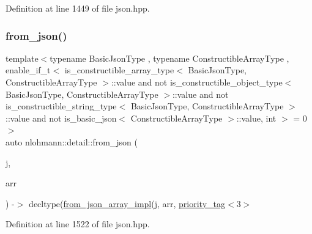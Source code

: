 Definition at line 1449 of file json.\+hpp.

\mbox{\label{namespacenlohmann_1_1detail_a14d8cdf544585f1c38eab6a0820e55f7}} 
\subsubsection{\texorpdfstring{from\_json()}{from\_json()}\hspace{0.1cm}{\footnotesize\ttfamily [12/18]}}
{\footnotesize\ttfamily template$<$typename Basic\+Json\+Type , typename Constructible\+Array\+Type , enable\+\_\+if\+\_\+t$<$ is\+\_\+constructible\+\_\+array\+\_\+type$<$ Basic\+Json\+Type, Constructible\+Array\+Type $>$\+::value and not is\+\_\+constructible\+\_\+object\+\_\+type$<$ Basic\+Json\+Type, Constructible\+Array\+Type $>$\+::value and not is\+\_\+constructible\+\_\+string\+\_\+type$<$ Basic\+Json\+Type, Constructible\+Array\+Type $>$\+::value and not is\+\_\+basic\+\_\+json$<$ Constructible\+Array\+Type $>$\+::value, int $>$  = 0$>$ \\
auto nlohmann\+::detail\+::from\+\_\+json (\begin{DoxyParamCaption}\item[{const Basic\+Json\+Type \&}]{j,  }\item[{Constructible\+Array\+Type \&}]{arr }\end{DoxyParamCaption}) -\/$>$ decltype(\mbox{\hyperlink{namespacenlohmann_1_1detail_a40f7bb070a60e8ba14fffb9c117fcbd8}{from\+\_\+json\+\_\+array\+\_\+impl}}(j, arr, \mbox{\hyperlink{structnlohmann_1_1detail_1_1priority__tag}{priority\+\_\+tag}}$<$3$>$ }



Definition at line 1522 of file json.\+hpp.

\mbox{\label{namespacenlohmann_1_1detail_a5b24896e5f5db6af06d939dde4b63fe1}} 
